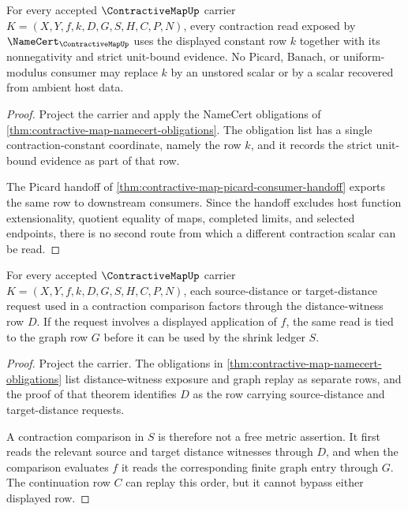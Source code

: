 \begin{theorem}
\label{thm:contractive-map-constant-row-exactness}
For every accepted $\ContractiveMapUp$ carrier $K=(X,Y,f,k,D,G,S,H,C,P,N)$, every contraction read exposed by $\NameCert_{\ContractiveMapUp}$ uses the displayed constant row $k$ together with its nonnegativity and strict unit-bound evidence. No Picard, Banach, or uniform-modulus consumer may replace $k$ by an unstored scalar or by a scalar recovered from ambient host data.
\end{theorem}
\begin{proof}
Project the carrier and apply the NameCert obligations of \autoref{thm:contractive-map-namecert-obligations}. The obligation list has a single contraction-constant coordinate, namely the row $k$, and it records the strict unit-bound evidence as part of that row.

The Picard handoff of \autoref{thm:contractive-map-picard-consumer-handoff} exports the same row to downstream consumers. Since the handoff excludes host function extensionality, quotient equality of maps, completed limits, and selected endpoints, there is no second route from which a different contraction scalar can be read.
\end{proof}

\begin{theorem}
\label{thm:contractive-map-distance-witness-stability}
For every accepted $\ContractiveMapUp$ carrier $K=(X,Y,f,k,D,G,S,H,C,P,N)$, each source-distance or target-distance request used in a contraction comparison factors through the distance-witness row $D$. If the request involves a displayed application of $f$, the same read is tied to the graph row $G$ before it can be used by the shrink ledger $S$.
\end{theorem}
\begin{proof}
Project the carrier. The obligations in \autoref{thm:contractive-map-namecert-obligations} list distance-witness exposure and graph replay as separate rows, and the proof of that theorem identifies $D$ as the row carrying source-distance and target-distance requests.

A contraction comparison in $S$ is therefore not a free metric assertion. It first reads the relevant source and target distance witnesses through $D$, and when the comparison evaluates $f$ it reads the corresponding finite graph entry through $G$. The continuation row $C$ can replay this order, but it cannot bypass either displayed row.
\end{proof}

